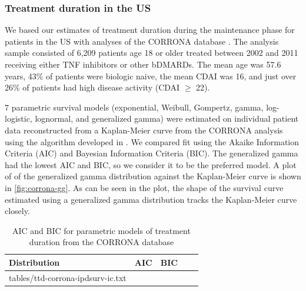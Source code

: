 \documentclass[11pt,final,fleqn]{article}
\makeatletter
\theoremstyle{plain}
\newcommand*\ExpandableInput[1]{\@@input#1 }
\makeatother
\begin{document}
\subsubsection{Treatment duration in the US}\label{sec:ttd-overall}
We based our estimates of treatment duration during the maintenance phase for patients in the US with analyses of the CORRONA database \citep{strand2013op0064}. The analysis sample consisted of 6,209 patients age 18 or older treated between 2002 and 2011 receiving either TNF inhibitors or other bDMARDs. The mean age was 57.6 years, 43\% of patients were biologic naive, the mean CDAI was 16, and just over 26\% of patients had high disease activity (CDAI $\geq$ 22). 

7 parametric survival models (exponential, Weibull, Gompertz, gamma, log-logistic, lognormal, and generalized gamma) were estimated on individual patient data reconstructed from a Kaplan-Meier curve from the CORRONA analysis using the algorithm developed in \citet{guyot2012enhanced}. We compared fit using the Akaike Information Criteria (AIC) and Bayesian Information Criteria (BIC). The generalized gamma had the lowest AIC and BIC, so we consider it to be the preferred model. A plot of of the generalized gamma distribution against the Kaplan-Meier curve is shown in \autoref{fig:corrona-gg}. As can be seen in the plot, the shape of the survival curve estimated using a generalized gamma distribution tracks the Kaplan-Meier curve closely.  


\begin{table}[!ht]
\begin{center}
\begin{threeparttable}
\caption{AIC and BIC for parametric models of treatment duration from the CORRONA database} \label{tbl:ic-ttd-corrona}
\begin{tabularx}{\textwidth}{@{\extracolsep{\fill}}lcccc}
\hline
\multicolumn{1}{l}{Distribution} & \multicolumn{1}{c}{AIC} & \multicolumn{1}{c}{BIC}  \\
\hline
\ExpandableInput{tables/ttd-corrona-ipdsurv-ic.txt}
\hline
\end{tabularx}
\end{threeparttable}
\end{center}
\end{table}
\end{document}

